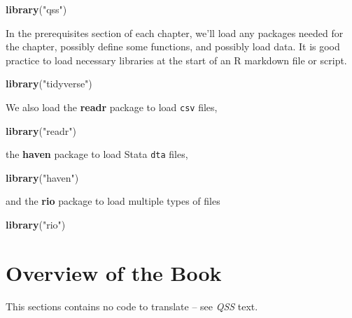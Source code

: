 \documentclass[]{book}
\newenvironment{Shaded}{\begin{snugshade}}{\end{snugshade}}
\newcommand{\KeywordTok}[1]{\textcolor[rgb]{0.13,0.29,0.53}{\textbf{#1}}}
\newcommand{\StringTok}[1]{\textcolor[rgb]{0.31,0.60,0.02}{#1}}
\newcommand{\NormalTok}[1]{#1}
\theoremstyle{definition}
\theoremstyle{definition}
\theoremstyle{definition}
\theoremstyle{remark}
\begin{document}
\begin{Shaded}
\begin{Highlighting}[]
\KeywordTok{library}\NormalTok{(}\StringTok{"qss"}\NormalTok{)}
\end{Highlighting}
\end{Shaded}

In the prerequisites section of each chapter, we'll load any packages
needed for the chapter, possibly define some functions, and possibly
load data. It is good practice to load necessary libraries at the start
of an R markdown file or script.

\begin{Shaded}
\begin{Highlighting}[]
\KeywordTok{library}\NormalTok{(}\StringTok{"tidyverse"}\NormalTok{)}
\end{Highlighting}
\end{Shaded}

We also load the \textbf{readr} package to load \texttt{csv} files,

\begin{Shaded}
\begin{Highlighting}[]
\KeywordTok{library}\NormalTok{(}\StringTok{"readr"}\NormalTok{)}
\end{Highlighting}
\end{Shaded}

the \textbf{haven} package to load Stata \texttt{dta} files,

\begin{Shaded}
\begin{Highlighting}[]
\KeywordTok{library}\NormalTok{(}\StringTok{"haven"}\NormalTok{)}
\end{Highlighting}
\end{Shaded}

and the \textbf{rio} package to load multiple types of files

\begin{Shaded}
\begin{Highlighting}[]
\KeywordTok{library}\NormalTok{(}\StringTok{"rio"}\NormalTok{)}
\end{Highlighting}
\end{Shaded}

\section{Overview of the Book}\label{overview-of-the-book}

This sections contains no code to translate -- see \emph{QSS} text.
\end{document}
